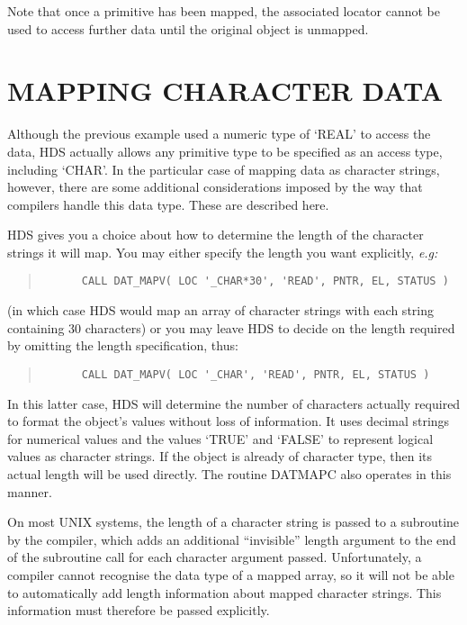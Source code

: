 \documentclass[twoside,11pt]{article}
\newcommand{\htmlref}[2]{#1}
\newcommand{\xlabel}[1]{}
\renewcommand{\_}{\texttt{\symbol{95}}}
\newcommand{\qt}[1]{``#1''}
\newcommand{\st}[1]{{\em{#1}}}
\newcommand{\qt}[1]{{\tt{"}}#1{\tt{"}}}
\begin{document}
Note that once a primitive has been mapped, the associated
\htmlref{locator}{sect:locators} cannot be used to access further data
until the original object is unmapped.

\section{\xlabel{mapping_character_data}\label{sect:charmapping}MAPPING CHARACTER DATA}

Although the \htmlref{previous example}{example:mapping} used a
numeric \htmlref{type}{sect:type} of `\_REAL' to access the data, HDS
actually allows any primitive type to be specified as an access type,
including `\_CHAR'. In the particular case of mapping data as
character strings, however, there are some additional considerations
imposed by the way that compilers handle this data type. These are
described here.

HDS gives you a choice about how to determine the length of the
character strings it will map. You may either specify the length you
want explicitly, \st{e.g:}

\small
\begin{quote}
\begin{verbatim}
      CALL DAT_MAPV( LOC '_CHAR*30', 'READ', PNTR, EL, STATUS )
\end{verbatim}
\end{quote}
\normalsize

(in which case HDS would map an array of character strings with each
string containing 30 characters) or you may leave HDS to decide on the
length required by omitting the length specification, thus:

\small
\begin{quote}
\begin{verbatim}
      CALL DAT_MAPV( LOC '_CHAR', 'READ', PNTR, EL, STATUS )
\end{verbatim}
\end{quote}
\normalsize

In this latter case, HDS will determine the number of characters
actually required to format the object's values without loss of
information. It uses decimal strings for numerical values and the
values `TRUE' and `FALSE' to represent logical values as character
strings. If the object is already of character type, then its actual
length will be used directly. The routine
\htmlref{DAT\_MAPC}{DAT_MAPx} also operates in this manner.

On most UNIX systems, the length of a character string is passed to a
subroutine by the compiler, which adds an additional \qt{invisible}
length argument to the end of the subroutine call for each character
argument passed. Unfortunately, a compiler cannot recognise the data
type of a mapped array, so it will not be able to automatically add
length information about mapped character strings. This information
must therefore be passed explicitly.
\end{document}
